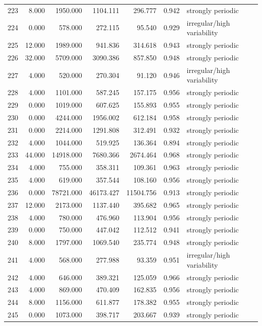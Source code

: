 \begin{longtable}{lrrrrrl}
223 & 8.000 & 1950.000 & 1104.111 & 296.777 & 0.942 & strongly periodic \\
224 & 0.000 & 578.000 & 272.115 & 95.540 & 0.929 & irregular/high variability \\
225 & 12.000 & 1989.000 & 941.836 & 314.618 & 0.943 & strongly periodic \\
226 & 32.000 & 5709.000 & 3090.386 & 857.850 & 0.948 & strongly periodic \\
227 & 4.000 & 520.000 & 270.304 & 91.120 & 0.946 & irregular/high variability \\
228 & 4.000 & 1101.000 & 587.245 & 157.175 & 0.956 & strongly periodic \\
229 & 0.000 & 1019.000 & 607.625 & 155.893 & 0.955 & strongly periodic \\
230 & 0.000 & 4244.000 & 1956.002 & 612.184 & 0.958 & strongly periodic \\
231 & 0.000 & 2214.000 & 1291.808 & 312.491 & 0.932 & strongly periodic \\
232 & 4.000 & 1044.000 & 519.925 & 136.364 & 0.894 & strongly periodic \\
233 & 44.000 & 14918.000 & 7680.366 & 2674.464 & 0.968 & strongly periodic \\
234 & 4.000 & 755.000 & 358.311 & 109.361 & 0.963 & strongly periodic \\
235 & 4.000 & 619.000 & 357.544 & 108.160 & 0.956 & strongly periodic \\
236 & 0.000 & 78721.000 & 46173.427 & 11504.756 & 0.913 & strongly periodic \\
237 & 12.000 & 2173.000 & 1137.440 & 395.682 & 0.965 & strongly periodic \\
238 & 4.000 & 780.000 & 476.960 & 113.904 & 0.956 & strongly periodic \\
239 & 0.000 & 750.000 & 447.042 & 112.512 & 0.941 & strongly periodic \\
240 & 8.000 & 1797.000 & 1069.540 & 235.774 & 0.948 & strongly periodic \\
241 & 4.000 & 568.000 & 277.988 & 93.359 & 0.951 & irregular/high variability \\
242 & 4.000 & 646.000 & 389.321 & 125.059 & 0.966 & strongly periodic \\
243 & 4.000 & 869.000 & 470.409 & 162.835 & 0.956 & strongly periodic \\
244 & 8.000 & 1156.000 & 611.877 & 178.382 & 0.955 & strongly periodic \\
245 & 0.000 & 1073.000 & 398.717 & 203.667 & 0.939 & strongly periodic \\

\end{longtable}
